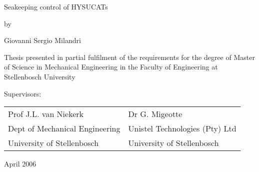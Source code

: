 \documentclass[14pt,afrikaans,english]{memoir}
\begin{document}
    \thispagestyle{empty}
    \vfill
   {\LARGE\noindent   Seakeeping control of HYSUCATs \par}
    \vspace{2em}
   {\large\indent     by \par}
    \vspace{2em}
   {\Large\noindent   Giovanni Sergio Milandri \par}%
    \vfill\noindent
    \begin{minipage}{.9\textwidth} \large\slshape\raggedright
    Thesis presented in partial fulfilment of the
    requirements for the degree of Master of Science in Mechanical Engineering in
    the Faculty of Engineering at Stellenbosch University
    \end{minipage}
    \vfill
   {\normalsize\noindent Supervisors:\\[1.5ex]
    \begin{tabular}{@{}ll@{}}
        Prof J.L. van Niekerk          & Dr G. Migeotte \\[.5ex]
        Dept of Mechanical Engineering & Unistel Technologies (Pty) Ltd\\
        University of Stellenbosch     & University of Stellenbosch
    \end{tabular}\par}
    \vspace{2em}
   {\large\noindent April 2006\par}%
    \clearpage
\end{document}

